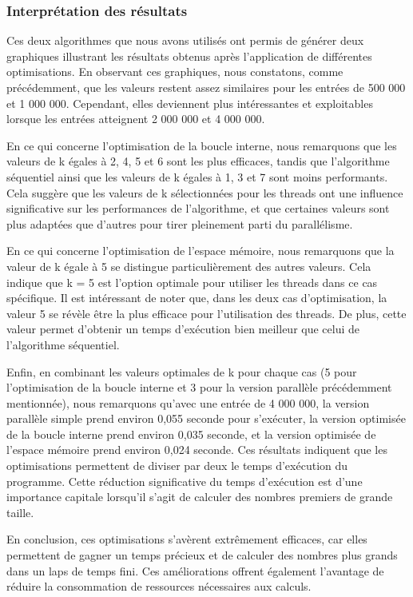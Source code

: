 \documentclass[
]{article}
\begin{document}
\pagebreak

\hypertarget{interpruxe9tation-des-ruxe9sultats}{%
\subsubsection{Interprétation des
résultats}\label{interpruxe9tation-des-ruxe9sultats}}

Ces deux algorithmes que nous avons utilisés ont permis de générer deux
graphiques illustrant les résultats obtenus après l'application de
différentes optimisations. En observant ces graphiques, nous constatons,
comme précédemment, que les valeurs restent assez similaires pour les
entrées de 500 000 et 1 000 000. Cependant, elles deviennent plus
intéressantes et exploitables lorsque les entrées atteignent 2 000 000
et 4 000 000.

En ce qui concerne l'optimisation de la boucle interne, nous remarquons
que les valeurs de k égales à 2, 4, 5 et 6 sont les plus efficaces,
tandis que l'algorithme séquentiel ainsi que les valeurs de k égales à
1, 3 et 7 sont moins performants. Cela suggère que les valeurs de k
sélectionnées pour les threads ont une influence significative sur les
performances de l'algorithme, et que certaines valeurs sont plus
adaptées que d'autres pour tirer pleinement parti du parallélisme.

En ce qui concerne l'optimisation de l'espace mémoire, nous remarquons
que la valeur de k égale à 5 se distingue particulièrement des autres
valeurs. Cela indique que k = 5 est l'option optimale pour utiliser les
threads dans ce cas spécifique. Il est intéressant de noter que, dans
les deux cas d'optimisation, la valeur 5 se révèle être la plus efficace
pour l'utilisation des threads. De plus, cette valeur permet d'obtenir
un temps d'exécution bien meilleur que celui de l'algorithme séquentiel.

Enfin, en combinant les valeurs optimales de k pour chaque cas (5 pour
l'optimisation de la boucle interne et 3 pour la version parallèle
précédemment mentionnée), nous remarquons qu'avec une entrée de 4 000
000, la version parallèle simple prend environ 0,055 seconde pour
s'exécuter, la version optimisée de la boucle interne prend environ
0,035 seconde, et la version optimisée de l'espace mémoire prend environ
0,024 seconde. Ces résultats indiquent que les optimisations permettent
de diviser par deux le temps d'exécution du programme. Cette réduction
significative du temps d'exécution est d'une importance capitale
lorsqu'il s'agit de calculer des nombres premiers de grande taille.

En conclusion, ces optimisations s'avèrent extrêmement efficaces, car
elles permettent de gagner un temps précieux et de calculer des nombres
plus grands dans un laps de temps fini. Ces améliorations offrent
également l'avantage de réduire la consommation de ressources
nécessaires aux calculs.
\end{document}
